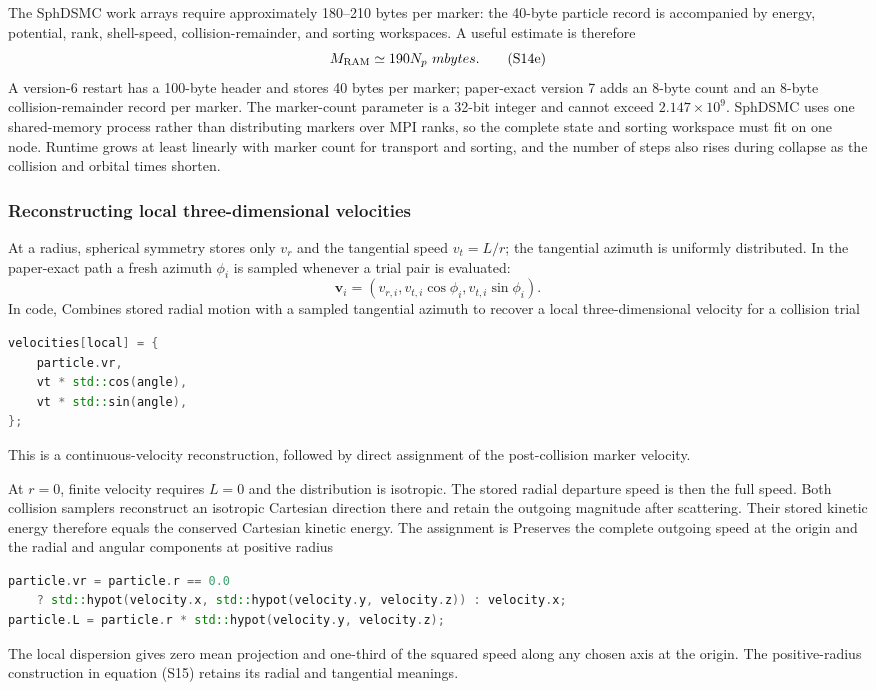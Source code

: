 The SphDSMC work arrays require approximately 180--210 bytes per marker: the
40-byte particle record is accompanied by energy, potential, rank,
shell-speed, collision-remainder, and sorting workspaces.  A useful estimate
is therefore
\[
 M_{\rm RAM}\simeq190N_p\ {
m bytes}.                    \tag{S14e}
\]
A version-6 restart has a 100-byte header and stores 40 bytes per marker;
paper-exact version 7 adds an 8-byte count and an 8-byte collision-remainder
record per marker.  The marker-count parameter is a 32-bit
integer and cannot exceed \(2.147\times10^9\).  SphDSMC uses one shared-memory
process rather than distributing markers over MPI ranks, so the complete
state and sorting workspace must fit on one node.  Runtime grows at least
linearly with marker count for transport and sorting, and the number of steps
also rises during collapse as the collision and orbital times shorten.

\subsubsection{Reconstructing local three-dimensional velocities}

At a radius, spherical symmetry stores only \(v_r\) and the tangential speed
\(v_t=L/r\); the tangential azimuth is uniformly distributed.  In the
paper-exact path a fresh azimuth \(\phi_i\) is sampled whenever a trial pair
is evaluated:
\[
 \bm v_i=(v_{r,i},v_{t,i}\cos\phi_i,v_{t,i}\sin\phi_i).
                                                               \tag{S15}
\]
In code,
{}
{Combines stored radial motion with a sampled tangential azimuth to recover a
 local three-dimensional velocity for a collision trial}
\begin{lstlisting}[language=C++]
velocities[local] = {
    particle.vr,
    vt * std::cos(angle),
    vt * std::sin(angle),
};
\end{lstlisting}
This is a continuous-velocity reconstruction, followed by direct assignment
of the post-collision marker velocity.

At \(r=0\), finite velocity requires \(L=0\) and the distribution is
isotropic. The stored radial departure speed is then the full speed.
Both collision samplers reconstruct an isotropic Cartesian direction there
and retain the outgoing magnitude after scattering. Their stored kinetic
energy therefore equals the conserved Cartesian kinetic energy. The
assignment is
{}
{Preserves the complete outgoing speed at the origin and the radial and
 angular components at positive radius}
\begin{lstlisting}[language=C++]
particle.vr = particle.r == 0.0
    ? std::hypot(velocity.x, std::hypot(velocity.y, velocity.z)) : velocity.x;
particle.L = particle.r * std::hypot(velocity.y, velocity.z);
\end{lstlisting}
The local dispersion gives zero mean projection and one-third of the squared
speed along any chosen axis at the origin. The positive-radius construction
in equation (S15) retains its radial and tangential meanings.

